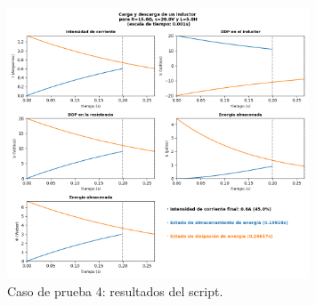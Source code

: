 \documentclass[../main.tex]{subfiles}
\begin{document}
\begin{figure}[!h]
    \centering
    \includegraphics[width=0.8\textwidth]{images/cp4-py.png}
    \caption{Caso de prueba 4: resultados del script. }
    \label{fig::cp4-py}
\end{figure}
\end{document}
